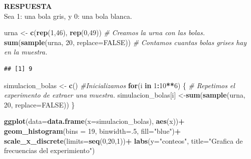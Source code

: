 \documentclass[11pt,]{article}
\newenvironment{Shaded}{\begin{snugshade}}{\end{snugshade}}
\newcommand{\CommentTok}[1]{\textcolor[rgb]{0.56,0.35,0.01}{\textit{#1}}}
\newcommand{\ControlFlowTok}[1]{\textcolor[rgb]{0.13,0.29,0.53}{\textbf{#1}}}
\newcommand{\DataTypeTok}[1]{\textcolor[rgb]{0.13,0.29,0.53}{#1}}
\newcommand{\DecValTok}[1]{\textcolor[rgb]{0.00,0.00,0.81}{#1}}
\newcommand{\KeywordTok}[1]{\textcolor[rgb]{0.13,0.29,0.53}{\textbf{#1}}}
\newcommand{\NormalTok}[1]{#1}
\newcommand{\OperatorTok}[1]{\textcolor[rgb]{0.81,0.36,0.00}{\textbf{#1}}}
\newcommand{\OtherTok}[1]{\textcolor[rgb]{0.56,0.35,0.01}{#1}}
\newcommand{\StringTok}[1]{\textcolor[rgb]{0.31,0.60,0.02}{#1}}
\newcommand{\res}{\textbf{RESPUESTA}\\}
\begin{document}
\res

Sea 1: una bola gris, y 0: una bola blanca.

\begin{Shaded}
\begin{Highlighting}[]
\NormalTok{urna <-}\StringTok{ }\KeywordTok{c}\NormalTok{(}\KeywordTok{rep}\NormalTok{(}\DecValTok{1}\NormalTok{,}\DecValTok{46}\NormalTok{), }\KeywordTok{rep}\NormalTok{(}\DecValTok{0}\NormalTok{,}\DecValTok{49}\NormalTok{)) }\CommentTok{# Creamos la urna con las bolas.}
\KeywordTok{sum}\NormalTok{(}\KeywordTok{sample}\NormalTok{(urna, }\DecValTok{20}\NormalTok{, }\DataTypeTok{replace=}\OtherTok{FALSE}\NormalTok{)) }\CommentTok{# Contamos cuantas bolas grises hay en la muestra.}
\end{Highlighting}
\end{Shaded}

\begin{verbatim}
## [1] 9
\end{verbatim}

\begin{Shaded}
\begin{Highlighting}[]
\NormalTok{simulacion_bolas <-}\StringTok{ }\KeywordTok{c}\NormalTok{() }\CommentTok{#Inicializamos }
\ControlFlowTok{for}\NormalTok{(i }\ControlFlowTok{in} \DecValTok{1}\OperatorTok{:}\DecValTok{10}\OperatorTok{**}\DecValTok{6}\NormalTok{) \{ }\CommentTok{# Repetimos el experimento de extraer una muestra.}
\NormalTok{ simulacion_bolas[i] <-}\KeywordTok{sum}\NormalTok{(}\KeywordTok{sample}\NormalTok{(urna, }\DecValTok{20}\NormalTok{, }\DataTypeTok{replace=}\OtherTok{FALSE}\NormalTok{))}
\NormalTok{\}}
\end{Highlighting}
\end{Shaded}

\begin{Shaded}
\begin{Highlighting}[]
\KeywordTok{ggplot}\NormalTok{(}\DataTypeTok{data=}\KeywordTok{data.frame}\NormalTok{(}\DataTypeTok{x=}\NormalTok{simulacion_bolas), }\KeywordTok{aes}\NormalTok{(x))}\OperatorTok{+}
\StringTok{  }\KeywordTok{geom_histogram}\NormalTok{(}\DataTypeTok{bins =} \DecValTok{19}\NormalTok{, }\DataTypeTok{binwidth=}\NormalTok{.}\DecValTok{5}\NormalTok{, }\DataTypeTok{fill=}\StringTok{"blue"}\NormalTok{)}\OperatorTok{+}
\StringTok{  }\KeywordTok{scale_x_discrete}\NormalTok{(}\DataTypeTok{limits=}\KeywordTok{seq}\NormalTok{(}\DecValTok{0}\NormalTok{,}\DecValTok{20}\NormalTok{,}\DecValTok{1}\NormalTok{))}\OperatorTok{+}
\StringTok{  }\KeywordTok{labs}\NormalTok{(}\DataTypeTok{y=}\StringTok{"conteos"}\NormalTok{, }\DataTypeTok{title=}\StringTok{"Grafica de frecuencias del experimiento"}\NormalTok{)}
\end{Highlighting}
\end{Shaded}
\end{document}
